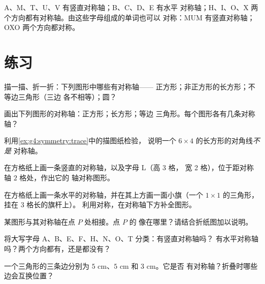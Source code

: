\begin{example}[字母中的对称]\label{ex:g4:symmetry:letters}
A、M、T、U、V 有竖直对称轴；B、C、D、E 有水平
对称轴；H、I、O、X 两个方向都有对称轴。由这些字母组成的单词也可以
对称：MUM 有竖直对称轴；OXO 两个方向都对称。
\end{example}

\section{练习}

\begin{exercise}[$\star$]\label{exo:g4:symmetry:1}
描一描、折一折：下列图形中哪些有对称轴——
正方形；非正方形的长方形；不等边三角形（三边
各不相等）；圆？
\end{exercise}

\begin{exercise}[$\star$]\label{exo:g4:symmetry:2}
画出下列图形的对称轴：正方形；长方形；等边
三角形。每个图形各有几条对称轴？
\end{exercise}

\begin{exercise}[$\star$]\label{exo:g4:symmetry:3}
利用\cref{ex:g4:symmetry:trace}中的描图纸检验，
说明一个 $6 \times 4$ 的长方形的对角线\emph{不是}
对称轴。
\end{exercise}

\begin{exercise}[$\star$]\label{exo:g4:symmetry:4}
在方格纸上画一条竖直的对称轴，以及字母 L（高 3 格，
宽 2 格），位于距对称轴 $2$ 格处，作出它的
轴对称图形。
\end{exercise}

\begin{exercise}[$\star$]\label{exo:g4:symmetry:5}
在方格纸上画一条水平的对称轴，并在其上方画一面小旗（一个 $1 \times
1$ 的三角形，挂在 $3$ 格长的旗杆上）。
利用对称，在对称轴下方补全图形。
\end{exercise}

\begin{exercise}[$\star$]\label{exo:g4:symmetry:6}
某图形与其对称轴在点 $P$ 处相接。点 $P$ 的
像在哪里？请结合折纸图加以说明。
\end{exercise}

\begin{exercise}[$\star$]\label{exo:g4:symmetry:7}
将大写字母 A、B、E、F、H、N、O、T 分类：有竖直对称轴吗？
有水平对称轴吗？两个方向都有，还是都没有？
\end{exercise}

\begin{exercise}[$\star$]\label{exo:g4:symmetry:8}
一个三角形的三条边分别为 $5$ cm、$5$ cm 和 $3$ cm。它是否
有对称轴？折叠时哪些边会互换位置？
\end{exercise}

